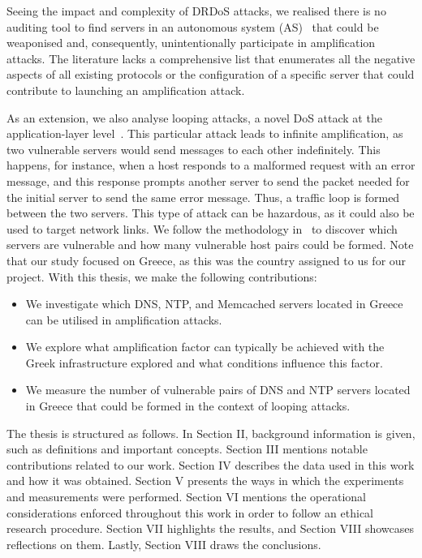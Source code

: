  Seeing the impact and complexity of DRDoS attacks, we realised there is no auditing tool to find servers in an autonomous system (AS)~\cite{autsys} that could be weaponised and, consequently, unintentionally participate in amplification attacks. The literature lacks a comprehensive list that enumerates all the negative aspects of all existing protocols or the configuration of a specific server that could contribute to launching an amplification attack.

 As an extension, we also analyse looping attacks, a novel DoS attack at the application-layer level~\cite{cispa-loopy}. This particular attack leads to infinite amplification, as two vulnerable servers would send messages to each other indefinitely. This happens, for instance, when a host responds to a malformed request with an error message, and this response prompts another server to send the packet needed for the initial server to send the same error message. Thus, a traffic loop is formed between the two servers. This type of attack can be hazardous, as it could also be used to target network links. We follow the methodology in~\cite{cispa-loopy} to discover which servers are vulnerable and how many vulnerable host pairs could be formed. Note that our study focused on Greece, as this was the country assigned to us for our project. With this thesis, we make the following contributions:

\begin{itemize}[left=0pt, itemsep=0pt]
    \item We investigate which DNS, NTP, and Memcached servers located in Greece can be utilised in amplification attacks. 

    \item  We explore what amplification factor can typically be achieved with the Greek infrastructure explored and what conditions influence this factor. 

    \item We measure the number of vulnerable pairs of DNS and NTP servers located in Greece that could be formed in the context of looping attacks.
    
\end{itemize}



 The thesis is structured as follows. In Section II, background information is given, such as definitions and important concepts. Section III mentions notable contributions related to our work. Section IV describes the data used in this work and how it was obtained. Section V presents the ways in which the experiments and measurements were performed. Section VI mentions the operational considerations enforced throughout this work in order to follow an ethical research procedure. Section VII highlights the results, and Section VIII showcases reflections on them. Lastly, Section VIII draws the conclusions. 







